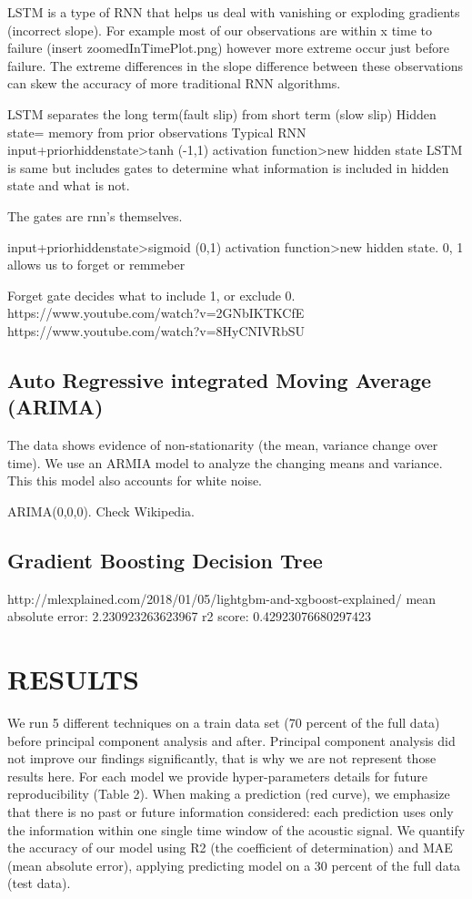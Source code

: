 \documentclass[]{llncs}
\begin{document}
LSTM is a type of RNN that helps us deal with vanishing or exploding gradients (incorrect slope). For example most of our observations are within x time to failure (insert zoomedInTimePlot.png) however more extreme occur just before failure. The extreme differences in the slope difference between these observations can skew the accuracy of more traditional RNN algorithms.

LSTM separates the long term(fault slip) from short term (slow slip)
Hidden state= memory from prior observations
Typical RNN input+priorhiddenstate>tanh (-1,1) activation function>new hidden state
LSTM is same but includes gates to determine what information is included in hidden state and what is not.

The gates are rnn's themselves.

input+priorhiddenstate>sigmoid (0,1) activation function>new hidden state. 0, 1 allows us to forget or remmeber 

Forget gate decides what to include 1, or exclude 0. 
https://www.youtube.com/watch?v=2GNbIKTKCfE
https://www.youtube.com/watch?v=8HyCNIVRbSU

\subsection{Auto Regressive integrated Moving Average (ARIMA)}
The data shows evidence of non-stationarity (the mean, variance change over time). We use an ARMIA model to analyze the changing means and variance. This this model also accounts for white noise.\par ARIMA(0,0,0). Check Wikipedia.

\subsection{Gradient Boosting Decision Tree}
http://mlexplained.com/2018/01/05/lightgbm-and-xgboost-explained/
mean absolute error: 2.230923263623967
r2 score: 0.42923076680297423

\section{RESULTS}

We run 5 different techniques on a train data set (70 percent of the full data) before principal component analysis and after. Principal component analysis did not improve our findings significantly, that is why we are not represent those results here. For each model we provide hyper-parameters details for future reproducibility (Table 2).
When making a prediction (red curve), we emphasize that there is no past or future information considered: each prediction uses only the information within one single time window of the acoustic signal. We quantify the accuracy of our model using R2 (the coefficient of determination) and MAE (mean absolute error), applying predicting model on a 30 percent of the full data (test data).
\end{document}
